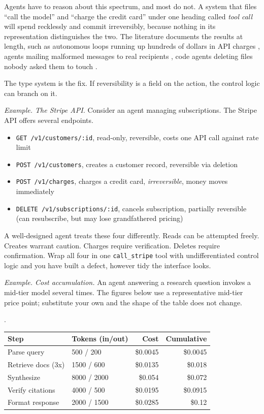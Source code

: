 Agents have to reason about this spectrum, and most do not. A system that files ``call the model'' and ``charge the credit card'' under one heading called \emph{tool call} will spend recklessly and commit irreversibly, because nothing in its representation distinguishes the two. The literature documents the results at length, such as autonomous loops running up hundreds of dollars in API charges \cite{yang2023autogpt}, agents mailing malformed messages to real recipients \cite{liu2023agentbench}, code agents deleting files nobody asked them to touch \cite{jimenez2024swebench}.

The type system is the fix. If reversibility is a field on the action, the control logic can branch on it.

\textit{Example. The Stripe API.} Consider an agent managing subscriptions. The Stripe API offers several endpoints.

\begin{itemize}
\item \texttt{GET /v1/customers/:id}, read-only, reversible, costs one API call against rate limit
\item \texttt{POST /v1/customers}, creates a customer record, reversible via deletion
\item \texttt{POST /v1/charges}, charges a credit card, \textit{irreversible}, money moves immediately
\item \texttt{DELETE /v1/subscriptions/:id}, cancels subscription, partially reversible (can resubscribe, but may lose grandfathered pricing)
\end{itemize}

A well-designed agent treats these four differently. Reads can be attempted freely. Creates warrant caution. Charges require verification. Deletes require confirmation. Wrap all four in one \texttt{call\_stripe} tool with undifferentiated control logic and you have built a defect, however tidy the interface looks.

\textit{Example. Cost accumulation.} An agent answering a research question invokes a mid-tier model several times. The figures below use a representative mid-tier price point; substitute your own and the shape of the table does not change.

\begin{center}.
\begin{tabular}{llrr}
\toprule
Step & Tokens (in/out) & Cost & Cumulative \\
\midrule
Parse query & 500 / 200 & \$0.0045 & \$0.0045 \\
Retrieve docs (3x) & 1500 / 600 & \$0.0135 & \$0.018 \\
Synthesize & 8000 / 2000 & \$0.054 & \$0.072 \\
Verify citations & 4000 / 500 & \$0.0195 & \$0.0915 \\
Format response & 2000 / 1500 & \$0.0285 & \$0.12 \\
\bottomrule
\end{tabular}
\end{center}

